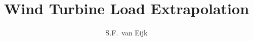 \documentclass{tudelft-report}
\begin{document}
\frontmatter

\title[Unceirtainty quantification in wind turbine load extrapolation]{Wind Turbine Load Extrapolation}
\author{S.F.\ van Eijk}

\makecover[backboxheight = 2.64in]






\tableofcontents

\mainmatter





\appendix




\end{document}
